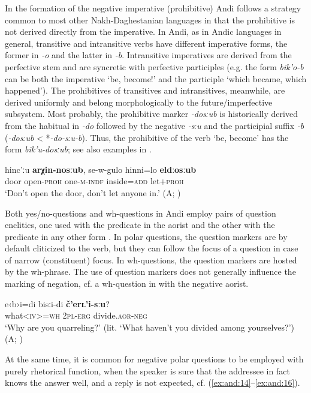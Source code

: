 \documentclass[output=paper,colorlinks=true, citecolor=brown]{langscibook}
\begin{document}
In the formation of the negative imperative (prohibitive) Andi follows a strategy common to most other Nakh-Daghestanian languages in that the prohibitive is not derived directly from the imperative. In Andi, as in Andic languages in general, transitive and intransitive verbs have different imperative forms, the former in \textit{{}-o} and the latter in \textit{{}-b}. Intransitive imperatives are derived from the perfective stem and are syncretic with perfective participles (e.g. the form \textit{bik’o-b} can be both the imperative ‘be, become!’ and the participle ‘which became, which happened’). The prohibitives of transitives and intransitives, meanwhile, are derived uniformly and belong morphologically to the future/imperfective subsystem. Most probably, the prohibitive marker \textit{{}-dosːub} is historically derived from the habitual in \textit{{}-do} followed by the negative \textit{{}-sːu} and the participial suffix \textit{{}-b} \mbox{(\textit{{}-dosːub}} < *\textit{{}-do-sːu-b}). Thus, the prohibitive of the verb ‘be, become’ has the form \textit{bik’u-dosːub}; see also examples in .

\ea
    \label{ex:and:12}
    \gll hinc’ːu \textbf{arχin{}-nosːub}, se{}-w{}-gulo hinni=lo \textbf{eldːosːub}\\
          door open-\textsc{proh} one-\textsc{m-indf} inside=\textsc{add} let+\textsc{proh} \\
    \glt ‘Don’t open the door, don’t let anyone in.’ (A; )
\z 

Both yes/no-questions and wh-questions in Andi employ pairs of question enclitics, one used with the predicate in the aorist and the other with the predicate in any other form \citep{Maisak2020}. In polar questions, the question markers are by default cliticized to the verb, but they can follow the focus of a question in case of narrow (constituent) focus. In wh-questions, the question markers are hosted by the wh-phrase. The use of question markers does not generally influence the marking of negation, cf. a wh-question in  with the negative aorist.

\ea
    \label{ex:and:13}
    \gll  e‹b›i=di bisːi{}-di \textbf{č’erʟ’i{}-sːu}?\\
          what<\textsc{iv>=wh} \textsc{2pl{}-erg} divide.\textsc{aor-neg} \\
    \glt ‘Why are you quarreling?’ (lit. ‘What haven’t you divided among yourselves?’) (A; )
\z

At the same time, it is common for negative polar questions to be employed with purely rhetorical function, when the speaker is sure that the addressee in fact knows the answer well, and a reply is not expected, cf. (\ref{ex:and:14}–\ref{ex:and:16}). 
\end{document}
